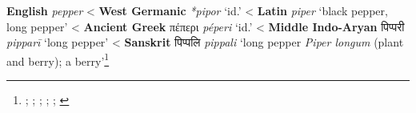 \begin{etymology}\label{ety:pepper}
\textbf{English} \textit{pepper}
< \textbf{West Germanic} \textit{*pipor} `id.'
< \textbf{Latin} \textit{piper} `black pepper, long pepper'
< \textbf{Ancient Greek} {πέπερι} \textit{péperi} `id.'
< \textbf{Middle Indo-Aryan} {पिप्परी } \textit{pipparī} `long pepper'
< \textbf{Sanskrit} {पिप्पलि } \textit{pippali} `long pepper \textit{Piper longum} (plant and berry); a berry'\footnote{\textcite{oed, med, bosworth_anglo-saxon_2014}; \textcite{oe}; \textcite{lewis_latin_1879}; \textcite{liddell_greek-english_1940}; \textcite[599]{sheth_paia-sadda-mahannavo_1923}; \textcite[626]{monier-williams_sanskrit-english_1899}}
\end{etymology}